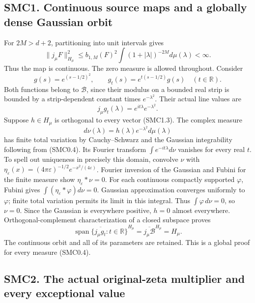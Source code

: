 \subsection{SMC1. Continuous source maps and a globally dense Gaussian
orbit}\label{smc1.-continuous-source-maps-and-a-globally-dense-gaussian-orbit}

For \(2M>d+2\), partitioning into unit intervals gives \[
\|j_\mu F\|_{H_\mu}^2
\le b_{1,M}(F)^2\int(1+|\lambda|)^{-2M}d\mu(\lambda)<\infty.
\tag{SMC1.1}
\] Thus the map is continuous. The zero measure is allowed throughout.
Consider \[
g(s)=e^{(s-1/2)^2},\qquad
g_t(s)=e^{t(s-1/2)}g(s)\quad(t\in\mathbb R).
\tag{SMC1.2}
\] Both functions belong to \(\mathcal B\), since their modulus on a
bounded real strip is bounded by a strip-dependent constant times
\(e^{-\lambda^2}\). Their actual line values are \[
j_\mu g_t(\lambda)=e^{it\lambda}e^{-\lambda^2}.
\tag{SMC1.3}
\] Suppose \(h\in H_\mu\) is orthogonal to every vector (SMC1.3). The
complex measure \[
d\nu(\lambda)=h(\lambda)e^{-\lambda^2}d\mu(\lambda)
\tag{SMC1.4}
\] has finite total variation by Cauchy--Schwarz and the Gaussian
integrability following from (SMC0.4). Its Fourier transform
\(\int e^{-it\lambda}d\nu\) vanishes for every real \(t\). To spell out
uniqueness in precisely this domain, convolve \(\nu\) with
\(\eta_\varepsilon(x)=(4\pi\varepsilon)^{-1/2}e^{-x^2/(4\varepsilon)}\).
Fourier inversion of the Gaussian and Fubini for the finite measure show
\(\eta_\varepsilon*\nu=0\). For each continuous compactly supported
\(\varphi\), Fubini gives \(\int(\eta_\varepsilon*\varphi)d\nu=0\).
Gaussian approximation converges uniformly to \(\varphi\); finite total
variation permits its limit in this integral. Thus
\(\int\varphi\,d\nu=0\), so \(\nu=0\). Since the Gaussian is everywhere
positive, \(h=0\) almost everywhere. Orthogonal-complement
characterization of a closed subspace proves \[
\overline{\operatorname{span}\{j_\mu g_t:t\in\mathbb R\}}^{H_\mu}
=\overline{j_\mu\mathcal B}^{H_\mu}=H_\mu.
\tag{SMC1.5}
\] The continuous orbit and all of its parameters are retained. This is
a global proof for every measure (SMC0.4).

\subsection{SMC2. The actual original-zeta multiplier and every
exceptional
value}\label{smc2.-the-actual-original-zeta-multiplier-and-every-exceptional-value}

